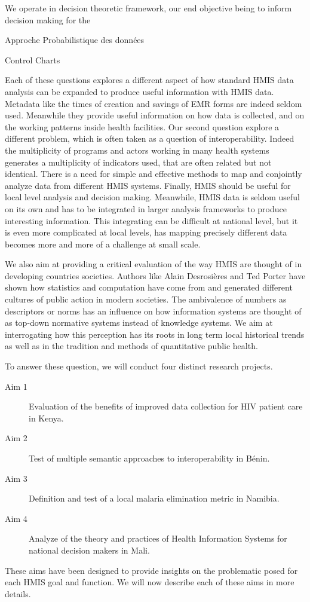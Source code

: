 	We operate in decision theoretic framework, our end objective being to inform decision making for the

	Approche Probabilistique des données

	Control Charts



	Each of these questions explores a different aspect of how standard HMIS data analysis can be expanded to produce useful information with HMIS data. Metadata like the times of creation and savings of EMR forms are indeed seldom used. Meanwhile they provide useful information on how data is collected, and on the working patterns inside health facilities. Our second question explore a different problem, which is often taken as a question of interoperability. Indeed the multiplicity of programs and actors working in many health systems generates a multiplicity of indicators used, that are often related but not identical. There is a need for simple and effective methods to map and conjointly analyze data from different HMIS systems. Finally, HMIS should be useful for local level analysis and decision making. Meanwhile, HMIS data is seldom useful on its own and has to be integrated in larger analysis frameworks to produce interesting information. This integrating can be difficult at national level, but it is even more complicated at local levels, has mapping precisely different data becomes more and more of a challenge at small scale.

	We also aim at providing a critical evaluation of the way HMIS are thought of in developing countries societies. Authors like Alain Desrosières and Ted Porter have shown how statistics and computation have come from and generated different cultures of public action in modern societies. The ambivalence of numbers as descriptors or norms has an influence on how information systems are thought of as top-down normative systems instead of knowledge systems. We aim at interrogating how this perception has its roots in long term local historical trends as well as in the tradition and methods of quantitative public health.


	To answer these question, we will conduct four distinct research projects.
	\begin{description}
		\item[Aim 1] Evaluation of the benefits of improved data collection for HIV patient care in Kenya.
		\item[Aim 2] Test of multiple semantic approaches to interoperability in Bénin.
		\item[Aim 3] Definition and test of a local malaria elimination metric in Namibia.
		\item[Aim 4] Analyze of the theory and practices of Health Information Systems for national decision makers in Mali.
	\end{description}

	These aims have been designed to provide insights on the problematic posed for each HMIS goal and function. We will now describe each of these aims in more details.
